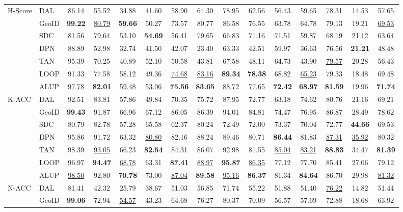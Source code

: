 \begin{tabular}{llccccccccccccc}
\cline{1-15}
\multirow[t]{7}{*}{H-Score}&DAL&86.14&55.52&34.88&41.60&58.90&64.30&78.95&62.56&56.43&59.65&78.31&14.53&57.65\\
&GeoID&\textbf{99.22}&\underline{80.79}&\textbf{59.66}&50.27&73.57&80.77&86.58&76.55&63.78&64.78&79.13&19.21&\underline{69.53}\\
&SDC&81.56&79.64&53.10&\textbf{54.69}&56.41&79.65&66.83&71.16&\underline{71.51}&59.87&68.19&\underline{21.12}&63.64\\
&DPN&88.89&52.98&32.74&41.50&42.07&23.40&63.33&42.51&59.97&36.63&76.56&\textbf{21.21}&48.48\\
&TAN&95.39&70.25&40.89&52.10&50.58&43.81&67.58&48.11&64.73&43.90&\underline{79.57}&20.28&56.43\\
&LOOP&91.33&77.58&58.12&49.36&\underline{74.68}&\underline{83.16}&\textbf{89.34}&\textbf{78.38}&68.82&\underline{65.23}&79.33&18.48&69.48\\
&ALUP&\underline{97.78}&\textbf{82.01}&\underline{59.48}&\underline{53.06}&\textbf{75.56}&\textbf{83.65}&\underline{88.72}&\underline{77.65}&\textbf{72.42}&\textbf{68.97}&\textbf{81.59}&19.96&\textbf{71.74}\\
\cline{1-15}
\multirow[t]{7}{*}{K-ACC}&DAL&92.51&83.81&57.86&49.84&70.35&75.72&87.95&72.77&63.18&74.62&80.76&21.16&69.21\\
&GeoID&\textbf{99.43}&91.87&66.96&67.12&86.05&86.39&94.01&84.81&74.47&76.95&86.87&28.49&78.62\\
&SDC&80.79&82.78&57.28&65.58&62.37&80.24&72.49&72.00&73.37&70.04&72.77&\textbf{44.66}&69.53\\
&DPN&95.86&91.72&63.32&\underline{80.80}&82.16&88.24&89.46&80.71&\textbf{86.44}&81.83&\underline{87.31}&\underline{35.92}&80.32\\
&TAN&98.39&\underline{93.05}&66.23&\textbf{82.54}&84.31&86.07&92.98&81.55&\underline{85.04}&\underline{83.21}&\textbf{88.83}&34.47&\textbf{81.39}\\
&LOOP&96.97&\textbf{94.47}&\underline{68.78}&63.31&\textbf{87.41}&\underline{88.97}&\textbf{95.87}&\underline{86.35}&77.12&77.70&85.41&27.06&79.12\\
&ALUP&\underline{98.50}&92.80&\textbf{70.78}&73.00&\underline{87.04}&\textbf{89.58}&\underline{95.16}&\textbf{86.37}&81.34&\textbf{84.64}&86.70&29.98&\underline{81.32}\\
\cline{1-15}
\multirow[t]{7}{*}{N-ACC}&DAL&81.41&42.32&25.79&38.67&51.03&56.85&71.74&55.22&51.88&51.40&\underline{76.22}&14.82&51.44\\
&GeoID&\textbf{99.06}&72.94&\underline{54.57}&43.23&64.68&76.27&80.37&70.09&56.57&57.69&72.88&18.68&63.92\\

\end{tabular}
